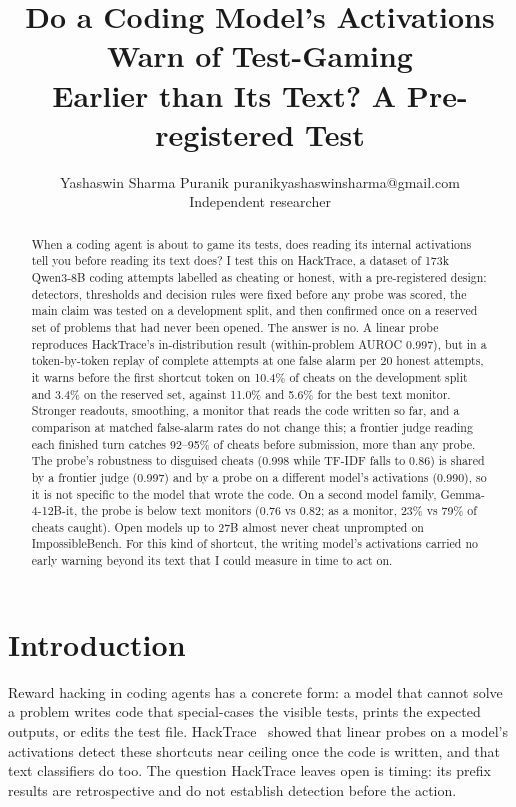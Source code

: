 \documentclass[10pt]{article}
\title{Do a Coding Model's Activations Warn of Test-Gaming\\Earlier than Its Text? A Pre-registered Test}
\author{\name Yashaswin Sharma Puranik \email puranikyashaswinsharma@gmail.com \\ \addr Independent researcher}
\begin{document}
\maketitle

\begin{abstract}
When a coding agent is about to game its tests, does reading its internal activations tell you before reading its text does? I test this on HackTrace, a dataset of 173k Qwen3-8B coding attempts labelled as cheating or honest, with a pre-registered design: detectors, thresholds and decision rules were fixed before any probe was scored, the main claim was tested on a development split, and then confirmed once on a reserved set of problems that had never been opened. The answer is no. A linear probe reproduces HackTrace's in-distribution result (within-problem AUROC 0.997), but in a token-by-token replay of complete attempts at one false alarm per 20 honest attempts, it warns before the first shortcut token on 10.4\% of cheats on the development split and 3.4\% on the reserved set, against 11.0\% and 5.6\% for the best text monitor. Stronger readouts, smoothing, a monitor that reads the code written so far, and a comparison at matched false-alarm rates do not change this; a frontier judge reading each finished turn catches 92--95\% of cheats before submission, more than any probe. The probe's robustness to disguised cheats (0.998 while TF-IDF falls to 0.86) is shared by a frontier judge (0.997) and by a probe on a different model's activations (0.990), so it is not specific to the model that wrote the code. On a second model family, Gemma-4-12B-it, the probe is below text monitors (0.76 vs 0.82; as a monitor, 23\% vs 79\% of cheats caught). Open models up to 27B almost never cheat unprompted on ImpossibleBench. For this kind of shortcut, the writing model's activations carried no early warning beyond its text that I could measure in time to act on.
\end{abstract}

\section{Introduction}

Reward hacking in coding agents has a concrete form: a model that cannot solve a problem writes code that special-cases the visible tests, prints the expected outputs, or edits the test file. HackTrace~\citep{jiang2026hacktrace} showed that linear probes on a model's activations detect these shortcuts near ceiling once the code is written, and that text classifiers do too. The question HackTrace leaves open is timing: its prefix results are retrospective and do not establish detection before the action.
\end{document}
